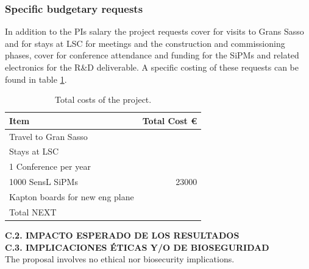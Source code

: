 \documentclass[a4paper,11pt,oneside]{article}
\begin{document}
\subsubsection*{Specific budgetary requests}
In addition to the PIs salary the project requests cover for visits to
Grans Sasso and for stays at LSC for meetings and the construction and
commissioning phases, cover for conference attendance and
funding for the SiPMs and related electronics for the R\&D
deliverable. A specific costing of these requests can be found in
table \ref{tab:TCOSTS}.
\begin{table}[!h]
  \begin{center}
    \begin{tabular}{|l|r|}
      \hline
      Item              & Total Cost \euro  \\
      \hline
      Travel to Gran Sasso & \\
      Stays at LSC & \\
      1 Conference per year & \\
      1000 SensL SiPMs & 23000 \\
      Kapton boards for new eng plane & \\
      \hline
      Total  NEXT        &  \\
      \hline
    \end{tabular}  
    \caption{Total costs of the project.}
    \label{tab:TCOSTS}
  \end{center}
\end{table} 

\noindent\textbf{C.2. IMPACTO ESPERADO DE LOS RESULTADOS}\\


\noindent\textbf{C.3. IMPLICACIONES \'ETICAS Y/O DE BIOSEGURIDAD}\\
The proposal involves no ethical nor biosecurity implications.
\end{document}
